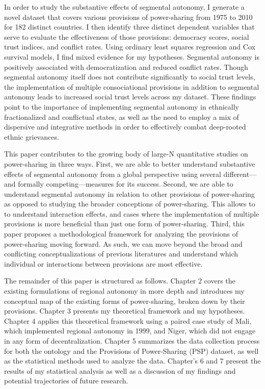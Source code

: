\documentclass[12pt]{article}
\begin{document}
In order to study the substantive effects of segmental autonomy, I generate a novel dataset that covers various provisions of power-sharing from 1975 to 2010 for 182 distinct countries. I then identify three distinct dependent variables that serve to evaluate the effectiveness of those provisions: democracy scores, social trust indices, and conflict rates. Using ordinary least squares regression and Cox survival models, I find mixed evidence for my hypotheses. Segmental autonomy is positively associated with democratization and reduced conflict rates. Though segmental autonomy itself does not contribute significantly to social trust levels, the implementation of multiple consociational provisions in addition to segmental autonomy leads to increased social trust levels across my dataset. These findings point to the importance of implementing segmental autonomy in ethnically fractionalized and conflictual states, as well as the need to employ a mix of dispersive and integrative methods in order to effectively combat deep-rooted ethnic grievances. 
 
This paper contributes to the growing body of large-N quantitative studies on power-sharing in three ways. First, we are able to better understand substantive effects of segmental autonomy from a global perspective using several different---and formally competing---measures for its success. Second, we are able to understand segmental autonomy in relation to other provisions of power-sharing as opposed to studying the broader conceptions of power-sharing. This allows to to understand interaction effects, and cases where the implementation of multiple provisions is more beneficial than just one form of power-sharing. Third, this paper proposes a methodological framework for analyzing the provisions of power-sharing moving forward. As such, we can move beyond the broad and conflicting conceptualizations of previous literatures and understand which individual or interactions between provisions are most effective. 

The remainder of this paper is structured as follows. Chapter 2 covers the existing formulations of regional autonomy in more depth and introduces my conceptual map of the existing forms of power-sharing, broken down by their provisions. Chapter 3 presents my theoretical framework and my hypotheses. Chapter 4 applies this theoretical framework using a paired case study of Mali, which implemented regional autonomy in 1999, and Niger, which did not engage in any form of decentralization. Chapter 5 summarizes the data collection process for both the ontology and the Provisions of Power-Sharing (PSP) dataset, as well as the statistical methods used to analyze the data. Chapter's 6 and 7 present the results of my statistical analysis as well as a discussion of my findings and potential trajectories of future research. 
\end{document}
